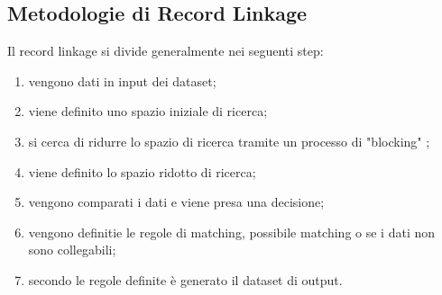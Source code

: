 \documentclass[a4paper,12pt]{article}
\begin{document}
\subsection{Metodologie di Record Linkage}
Il record linkage si divide generalmente nei seguenti step:
\begin{enumerate}
\item vengono dati in input dei dataset;
\item viene definito uno spazio iniziale di ricerca;
\item si cerca di ridurre lo spazio di ricerca tramite un processo di "blocking" ;
\item viene definito lo spazio ridotto di ricerca;
\item vengono comparati i dati e viene presa una decisione;
\item vengono definitie le regole di matching, possibile matching o se i dati non sono collegabili;
\item secondo le regole definite è generato il dataset di output.
\end{enumerate}
\end{document}
